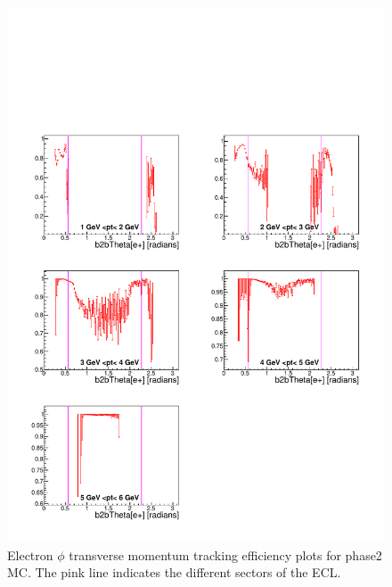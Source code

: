 \documentclass[a4paper,11pt,twosided,final,german,openbib,pdftex,listof=totoc,bibliography=totoc]{scrbook}
\begin{document}
\begin{appendix}
\clearpage

\begin{figure}[!htbp]
	\centering
	\includegraphics[width=\textwidth]{Plots/master/xPtMThetaem_MC}
	\caption[Transverse Momentum $\theta$ Electron Efficiency Phase2 MC]{Electron $\phi$ transverse momentum tracking efficiency plots for phase2 MC. The pink line indicates the different sectors of the ECL.}
	\label{plt:PtMThetaem_MC}
\end{figure}



\end{appendix}
\end{document}
